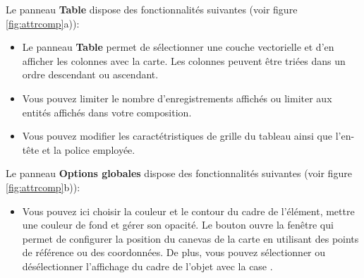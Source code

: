 
Le panneau \textbf{Table} dispose des fonctionnalités suivantes (voir figure  \ref{fig:attrcomp}a)):

\begin{itemize}[label=--]
\item Le panneau \textbf{Table} permet de sélectionner une couche vectorielle et d'en afficher les colonnes avec la carte. Les colonnes peuvent être triées dans un ordre descendant ou ascendant.
\item Vous pouvez limiter le nombre d'enregistrements affichés ou limiter aux entités affichés dans votre composition.
\item Vous pouvez modifier les caractétristiques de grille du tableau ainsi que l'en-tête et la police employée.
\end{itemize}


Le panneau \textbf{Options globales} dispose des fonctionnalités suivantes (voir figure  \ref{fig:attrcomp}b)):

\begin{itemize}[label=--]
\item Vous pouvez ici choisir la couleur et le contour du cadre de l'élément, mettre une couleur de fond et gérer son opacité. Le bouton  ouvre la fenêtre  qui permet de configurer la position du canevas de la carte en utilisant des points de référence ou des coordonnées. De plus, vous pouvez sélectionner ou désélectionner l'affichage du cadre de l'objet avec la case .
\end{itemize}

